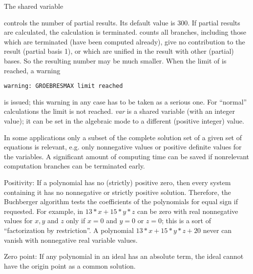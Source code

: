 The shared variable
\hypertarget{reserved:GROEBRESMAX}{}
\begin{center}
\end{center}
controls the number of partial results. Its default value is 300. If
 partial results are calculated, the calculation is
terminated.  counts all branches, including those which
are terminated (have been computed already), give no contribution to
the result (partial basis 1), or which are unified in the result with
other (partial) bases. So the resulting number may be much smaller.
When the limit of  is reached, a warning

\texttt{warning: GROEBRESMAX limit reached}

is issued; this warning in any case has to be taken as a serious one.
For ``normal'' calculations the  limit is not reached.
\emph{var} is a shared variable (with an integer value); it can be
set in the algebraic mode to a different (positive integer) value.

In some applications only a subset of the complete solution set
of a given set of equations is relevant, e.g. only
nonnegative values or positive definite values for the variables.
A significant amount of computing time can be saved if
nonrelevant computation branches can be terminated early.

Positivity: If a polynomial has no (strictly) positive zero, then
every system containing it has no nonnegative or strictly positive
solution. Therefore, the Buchberger algorithm tests the coefficients of
the polynomials for equal sign if requested. For example, in $13*x +
15*y*z $ can be zero with real nonnegative values for $x, y$ and $z$
only if $x=0$ and $y=0$ or $ z=0$; this is a sort of ``factorization by
restriction''. A polynomial $13*x + 15*y*z + 20$ never can vanish
with nonnegative real variable values.

Zero point:  If any polynomial in an ideal has an absolute term, the ideal
cannot have the origin point as a common solution.

